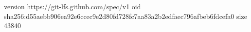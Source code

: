 version https://git-lfs.github.com/spec/v1
oid sha256:d55aebb906ea92e6ccec9e2d80fd728fc7aa83a2b2edfaec796afbeb6fdcefa0
size 43840
